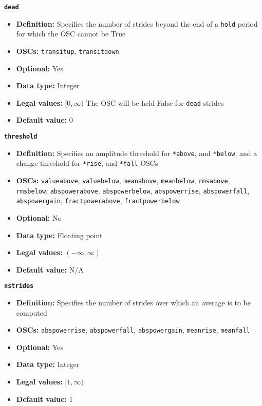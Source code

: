 {{\large\texttt{\textbf{dead}}}
\begin{itemize}
\item \textbf{Definition:} Specifies the number of strides beyond the end
  of a \texttt{hold} period for which the OSC cannot be True
\item \textbf{OSCs:} \texttt{transitup}, \texttt{transitdown}
\item \textbf{Optional:} Yes
\item \textbf{Data type:} Integer
\item \textbf{Legal values:} $[0, \infty)$ The OSC will be held False for
  \texttt{dead} strides
\item \textbf{Default value:} $0$
\end{itemize}

{\large\texttt{\textbf{threshold}}}
\begin{itemize}
\item \textbf{Definition:} Specifies an amplitude threshold for
  \texttt{*above}, and \texttt{*below}, and a change threshold for
  \texttt{*rise}, and \texttt{*fall} OSCs
\item \textbf{OSCs:} \texttt{valueabove}, \texttt{valuebelow},
  \texttt{meanabove}, \texttt{meanbelow}, \texttt{rmsabove}, 
  \texttt{rmsbelow}, \texttt{abspowerabove}, \texttt{abspowerbelow}, 
  \texttt{abspowerrise}, \texttt{abspowerfall},
  \texttt{abspowergain},  
  \texttt{fractpowerabove}, \texttt{fractpowerbelow}
\item \textbf{Optional:} No
\item \textbf{Data type:} Floating point
\item \textbf{Legal values:} $(-\infty, \infty)$
\item \textbf{Default value:} N/A
\end{itemize}

{\large\texttt{\textbf{nstrides}}}
\begin{itemize}
\item \textbf{Definition:} Specifies the number of strides over which
  an average is to be computed
\item \textbf{OSCs:} \texttt{abspowerrise},
  \texttt{abspowerfall}, \texttt{abspowergain}, \texttt{meanrise},
  \texttt{meanfall}
\item \textbf{Optional:} Yes
\item \textbf{Data type:} Integer
\item \textbf{Legal values:} $[1, \infty)$
\item \textbf{Default value:} 1
\end{itemize}

}

